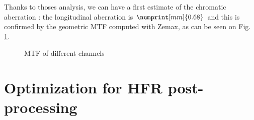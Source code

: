 \documentclass[10pt,letterpaper]{article}
\begin{document}
Thanks to thoses analysis, we can have a first estimate of the chromatic aberration : the longitudinal aberration is $\numprint[mm]{0.68}$ and this is confirmed by the geometric MTF computed with Zemax, as can be seen on Fig. \ref{}.
\begin{figure}[h]
    \centering
	\caption{MTF of different channels }
\end{figure}

\section{Optimization for HFR post-processing}














\listoffigures
\end{document}
